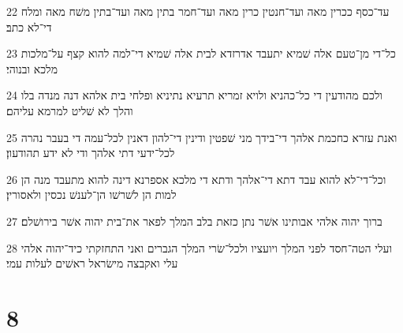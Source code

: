 \par 22 עד־כסף ככרין מאה ועד־חנטין כרין מאה ועד־חמר בתין מאה ועד־בתין משׁח מאה ומלח די־לא כתב׃
\par 23 כל־די מן־טעם אלה שׁמיא יתעבד אדרזדא לבית אלה שׁמיא די־למה להוא קצף על־מלכות מלכא ובנוהי׃
\par 24 ולכם מהודעין די כל־כהניא ולויא זמריא תרעיא נתיניא ופלחי בית אלהא דנה מנדה בלו והלך לא שׁליט למרמא עליהם׃
\par 25 ואנת עזרא כחכמת אלהך די־בידך מני שׁפטין ודינין די־להון דאנין לכל־עמה די בעבר נהרה לכל־ידעי דתי אלהך ודי לא ידע תהודעון׃
\par 26 וכל־די־לא להוא עבד דתא די־אלהך ודתא די מלכא אספרנא דינה להוא מתעבד מנה הן למות הן לשׁרשׁו הן־לענשׁ נכסין ולאסורין׃
\par 27 ברוך יהוה אלהי אבותינו אשׁר נתן כזאת בלב המלך לפאר את־בית יהוה אשׁר בירושׁלם׃
\par 28 ועלי הטה־חסד לפני המלך ויועציו ולכל־שׂרי המלך הגברים ואני התחזקתי כיד־יהוה אלהי עלי ואקבצה מישׂראל ראשׁים לעלות עמי׃

\chapter{8}

